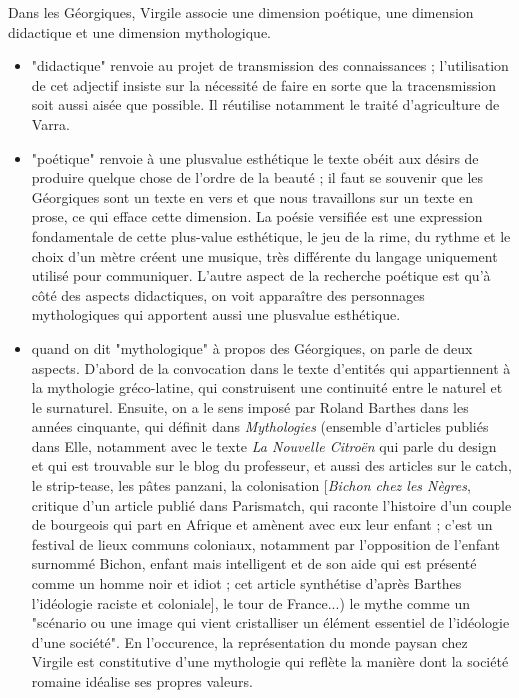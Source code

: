 \documentclass[a4paper,12pt]{book}
\begin{document}
\par Dans les Géorgiques, Virgile associe une dimension poétique, une dimension didactique et une dimension mythologique.\begin{itemize}
\item "didactique" renvoie au projet de transmission des connaissances ; l'utilisation de cet adjectif insiste sur la nécessité de faire en sorte que la tracensmission soit aussi aisée que possible. Il réutilise notamment le traité d'agriculture de Varra.
\item "poétique" renvoie à une plusvalue esthétique le texte obéit aux désirs de produire quelque chose de l'ordre de la beauté ; il faut se souvenir que les Géorgiques sont un texte en vers et que nous travaillons sur un texte en prose, ce qui efface cette dimension. La poésie versifiée est une expression fondamentale de cette plus-value esthétique, le jeu de la rime, du rythme et le choix d'un mètre créent une musique, très différente du langage uniquement utilisé pour communiquer. L'autre aspect de la recherche poétique est qu'à côté des aspects didactiques, on voit apparaître des personnages mythologiques qui apportent aussi une plusvalue esthétique.
\item quand on dit "mythologique" à propos des Géorgiques, on parle de deux aspects. D'abord de la convocation dans le texte d'entités qui appartiennent à la mythologie gréco-latine, qui construisent une continuité entre le naturel et le surnaturel. Ensuite, on a le sens imposé par Roland Barthes dans les années cinquante, qui définit dans \textit{Mythologies} (ensemble d'articles publiés dans Elle, notamment avec le texte \textit{La Nouvelle Citroën} qui parle du design et qui est trouvable sur le blog du professeur, et aussi des articles sur le catch, le strip-tease, les pâtes panzani, la colonisation [\textit{Bichon chez les Nègres}, critique d'un article publié dans Parismatch, qui raconte l'histoire d'un couple de bourgeois qui part en Afrique et amènent avec eux leur enfant ; c'est un festival de lieux communs coloniaux, notamment par l'opposition de l'enfant surnommé Bichon, enfant mais intelligent et de son aide qui est présenté comme un homme noir et idiot ; cet article synthétise d'après Barthes l'idéologie raciste et coloniale], le tour de France...) le mythe comme un "scénario ou une image qui vient cristalliser un élément essentiel de l'idéologie d'une société". En l'occurence, la représentation du monde paysan chez Virgile est constitutive d'une mythologie qui reflète la manière dont la société romaine idéalise ses propres valeurs.
\end{itemize}
\end{document}
